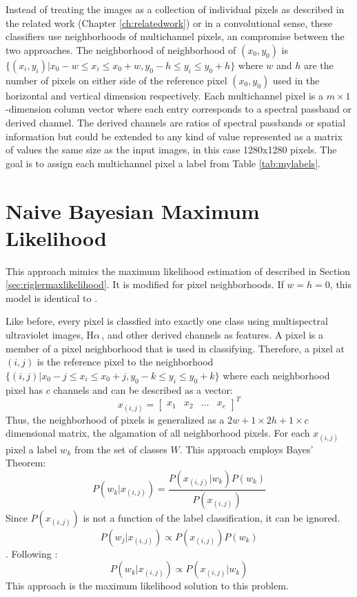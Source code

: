 \documentclass[twoside]{report}
\newcommand{\halpha}{H$\alpha$\,}
\begin{document}
Instead of treating the images as a collection of individual pixels as described in the related work (Chapter \ref{ch:relatedwork}) or in a convolutional sense, these classifiers use neighborhoods of multichannel pixels, an compromise between the two approaches. The neighborhood of neighborhood of $(x_0, y_0)$ is $\{(x_i, y_i) | x_0 - w \le x_i \le x_0 + w, y_0 - h \le y_i \le y_0 + h\}$  where $w$ and $h$ are the number of pixels on either side of the reference pixel $(x_0, y_0)$ used in the horizontal and vertical dimension respectively. Each multichannel pixel is a $m \times 1$-dimension column vector where each entry corresponds to a spectral passband or derived channel. The derived channels are ratios of spectral passbands or spatial information but could be extended to any kind of value represented as a matrix of values the same size as the input images, in this case 1280x1280 pixels. The goal is to assign each multichannel pixel a label from Table \ref{tab:mylabels}. 


\section{Naive Bayesian Maximum Likelihood}

This approach mimics the maximum likelihood estimation of \cite{rigler:2012} described in Section \ref{sec:riglermaxlikelihood}. It is modified for pixel neighborhoods. If $w=h=0$, this model is identical to \cite{rigler:2012}. 

Like before, every pixel is classfied into exactly one class using multispectral ultraviolet images, \halpha, and other derived channels as features. A pixel is a member of a pixel neighborhood that is used in classifying. Therefore, a pixel at $(i,j)$ is the reference pixel to the neighborhood $\{(i, j) | x_0 - j \le x_i \le x_0 + j, y_0 - k \le y_i \le y_0 + k\}$ where each neighborhood pixel has $c$ channels and can be described as a vector:
\[x_{(i,j)} = \begin{bmatrix} x_1 & x_2 & \hdots & x_c \end{bmatrix}^T \]
Thus, the neighborhood of pixels is generalized as a $2w + 1 \times 2h + 1 \times c$ dimensional matrix, the algamation of all neighborhood pixels. 
For each $x_{(i,j)}$ pixel a label $w_k$ from the set of classes $W$. This approach employs Bayes' Theorem:
\[ P(w_k | x_{(i,j)}) = \frac{P(x_{(i,j)} | w_k) P(w_k)}{P(x_{(i,j)})} \]
Since $P(x_{(i,j)})$ is not a function of the label classification, it can be ignored.
\[ P(w_j | x_{(i,j)}) \propto P(x_{(i,j)}) P(w_{k}) \].
Following \cite{rigler:2012}: 
\[ P(w_k | x_{(i,j)}) \propto P(x_{(i,j)} | w_k) \]
This approach is the maximum likelihood solution to this problem.
\end{document}
